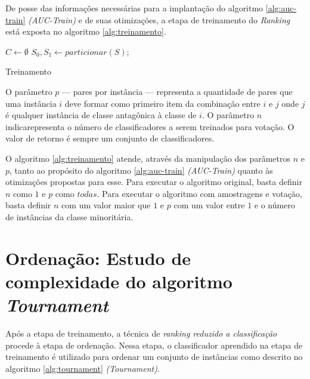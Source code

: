De posse das informações necessárias para a implantação do algoritmo \ref{alg:auc-train} \emph{(AUC-Train)} e de suas otimizações, a etapa de treinamento do \emph{Ranking} está exposta no algoritmo \ref{alg:treinamento}.

\begin{algorithm}[h!]

    $C \gets \emptyset$\;
    $S_0, S_1 \gets particionar(S)$;



    \caption{Treinamento}
    \label{alg:treinamento}
\end{algorithm}

O parâmetro $p$ --- pares por instância --- representa a quantidade de pares que uma instância $i$ deve formar como primeiro item da combinação entre $i$ e $j$ onde $j$ é qualquer instância de classe antagônica à classe de $i$. O parâmetro $n$ indicarepresenta o número de classificadores a serem treinados para votação. O valor de retorno é sempre um conjunto de classificadores.

O algoritmo \ref{alg:treinamento} atende, através da manipulação dos parâmetros $n$ e $p$, tanto ao propósito do algoritmo \ref{alg:auc-train} \emph{(AUC-Train)} quanto às otimizações propostas para esse. Para executar o algoritmo original, basta definir $n$ como $1$ e $p$ como $todas$. Para executar o algoritmo com amostragens e votação, basta definir $n$ com um valor maior que $1$ e $p$ com um valor entre $1$ e o número de instâncias da classe minoritária.


\section{Ordenação: Estudo de complexidade do algoritmo \emph{Tournament}}

Após a etapa de treinamento, a técnica de \emph{ranking reduzido a classificação} procede à etapa de ordenação. Nessa etapa, o classificador aprendido na etapa de treinamento é utilizado para ordenar um conjunto de instâncias como descrito no algoritmo \ref{alg:tournament} \emph{(Tournament)}.

